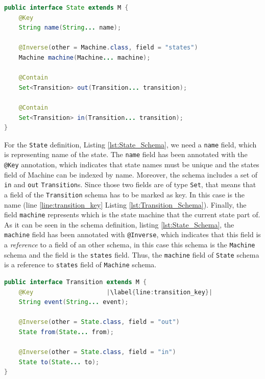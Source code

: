 \begin{sourcecode}[H]
	\begin{lstlisting}[language=Java,escapechar=|]
public interface State extends M {
	@Key
	String name(String... name);

	@Inverse(other = Machine.class, field = "states")
	Machine machine(Machine... machine);

	@Contain
	Set<Transition> out(Transition... transition);

	@Contain
	Set<Transition> in(Transition... transition);
}
	\end{lstlisting}
	\caption{The State Schema}
	\label{lst:State_Schema}
\end{sourcecode}

For the \texttt{State} definition, Listing \ref{lst:State_Schema}, we need a \texttt{name} field, which is representing name of the state. 
The \texttt{name} field has been annotated with the \texttt{@Key} annotation, which indicates that state names must be unique and the states field of Machine can be indexed by name.
Moreover, the schema includes a set of \texttt{in} and \texttt{out} \texttt{Transition}s.
Since those two fields are of type \texttt{Set}, that means that a field of the \texttt{Transition} schema has to be marked as key.
In this case is the name (line \ref{line:transition_key} Listing \ref{lst:Transition_Schema}).
Finally, the field \texttt{machine} represents which is the state machine that the current state part of. 
As it can be seen in the schema definition, listing \ref{lst:State_Schema}, the \texttt{machine} field has been annotated with \texttt{@Inverse}, which indicates that this field is a \textit{reference} to a field of an other schema, in this case this schema is the \texttt{Machine} schema and the field is the \texttt{states} field.
Thus, the \texttt{machine} field of \texttt{State} schema is a reference to \texttt{states} field of \texttt{Machine} schema.

\begin{sourcecode}[H]
	\begin{lstlisting}[language=Java,escapechar=|]
public interface Transition extends M {
	@Key 					|\label{line:transition_key}| 
	String event(String... event);

	@Inverse(other = State.class, field = "out")
	State from(State... from);

	@Inverse(other = State.class, field = "in")
	State to(State... to);
}
	\end{lstlisting}
	\caption{The Transition Schema}
	\label{lst:Transition_Schema}
\end{sourcecode}

